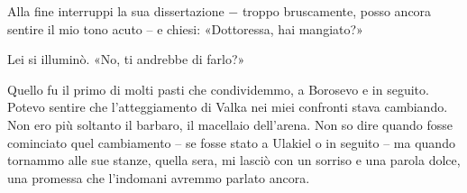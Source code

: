 Alla fine interruppi la sua dissertazione − troppo bruscamente, posso
ancora sentire il mio tono acuto -- e chiesi: «Dottoressa, hai
mangiato?»

Lei si illuminò. «No, ti andrebbe di farlo?»

\begin{figure}
	\centering
	\def\svgwidth{\columnwidth}
	\scalebox{0.2}{}
\end{figure}

Quello fu il primo di molti pasti che condividemmo, a Borosevo e in
seguito. Potevo sentire che l'atteggiamento di Valka nei miei confronti
stava cambiando. Non ero più soltanto il barbaro, il macellaio
dell'arena. Non so dire quando fosse cominciato quel cambiamento -- se
fosse stato a Ulakiel o in seguito -- ma quando tornammo alle sue
stanze, quella sera, mi lasciò con un sorriso e una parola dolce, una
promessa che l'indomani avremmo parlato ancora.


